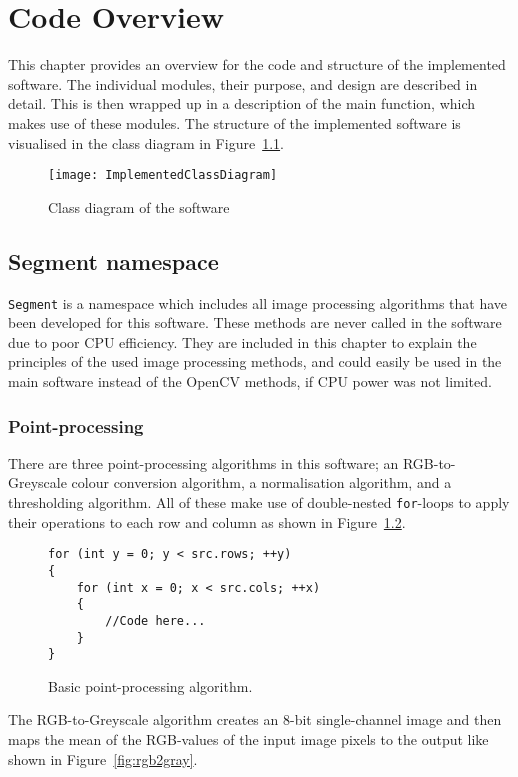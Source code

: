 \chapter{Code Overview}\label{ch:codeover}
This chapter provides an overview for the code and structure of the implemented software. The individual modules, their purpose, and design are described in detail. This is then wrapped up in a description of the main function, which makes use of these modules.
The structure of the implemented software is visualised in the class diagram in Figure~\ref{fig:implementedClassDiagram}.

\begin{figure}
	\centering
	\texttt{[image: ImplementedClassDiagram]}
	\caption{Class diagram of the software \label{fig:implementedClassDiagram}}
	
\end{figure}


\section{Segment namespace}
\texttt{Segment} is a namespace which includes all image processing algorithms that have been developed for this software. These methods are never called in the software due to poor CPU efficiency. They are included in this chapter to explain the principles of the used image processing methods, and could easily be used in the main software instead of the OpenCV methods, if CPU power was not limited.

\subsection{Point-processing}
There are three point-processing algorithms in this software; an RGB-to-Greyscale colour conversion algorithm, a normalisation algorithm, and a thresholding algorithm. All of these make use of double-nested \texttt{for}-loops to apply their operations to each row and column as shown in Figure~\ref{fig:pointprocess}.
\begin{figure}[!h]
\begin{lstlisting}
for (int y = 0; y < src.rows; ++y)
{
	for (int x = 0; x < src.cols; ++x)
	{
		//Code here...
	}
}
\end{lstlisting}
\caption{Basic point-processing algorithm. \label{fig:pointprocess}}
\end{figure} 

The RGB-to-Greyscale algorithm creates an 8-bit single-channel image and then maps the mean of the RGB-values of the input image pixels to the output like shown in Figure~\ref{fig:rgb2gray}.

